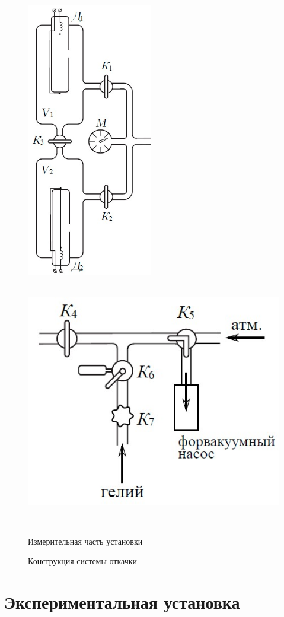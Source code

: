 \documentclass[a4paper,12pt]{article} %
\begin{document}
\begin{figure}[htbp]
	\includegraphics[width=55mm]{ris2.jpg}
	\hfill
	\includegraphics[height=110mm]{ris3.jpg}\\
	\parbox{55mm}{\caption{Измерительная часть установки}\label{ris2}}
	\hfill
	\parbox{110mm}{\caption{Конструкция системы откачки}\label{ris3}}
\end{figure}

\section{Экспериментальная установка}
\end{document}
